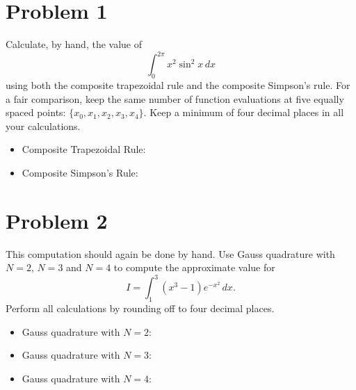 \section{Problem 1}%
\label{sec:problem_1}
Calculate, by hand, the value of
\begin{equation*}
  \int_{0}^{2 \pi} x^{2} \sin^{2}{x} \, dx
\end{equation*}
using both the composite trapezoidal rule and the composite Simpson's rule. For a fair comparison, keep the same number of function evaluations at five equally spaced points: $\{x_{0}, x_{1}, x_{2}, x_{3}, x_{4}\}$. Keep a minimum of four decimal places in all your calculations.
\begin{solution}
  \quad
  \begin{itemize}
    \item Composite Trapezoidal Rule:
      \newpage                                    %
    \item Composite Simpson's Rule:
      \vfill                                      %
  \end{itemize}
\end{solution}

\section{Problem 2}%
\label{sec:problem_2}
This computation should again be done by hand. Use Gauss quadrature with $N = 2$, $N = 3$ and $N = 4$ to compute the approximate value for
\begin{equation*}
  I = \int_{1}^{3} (x^{3} - 1) e^{-x^{2}} \, dx.
\end{equation*}
Perform all calculations by rounding off to four decimal places.
\begin{solution}
  \quad
  \begin{itemize}
    \item Gauss quadrature with $N = 2$:
      \newpage                                    %
    \item Gauss quadrature with $N = 3$:
      \newpage                                    %
    \item Gauss quadrature with $N = 4$:
      \vfill                                      %
  \end{itemize}
\end{solution}

